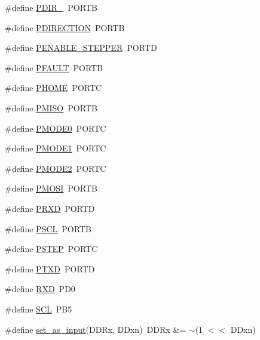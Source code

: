 \begin{DoxyCompactItemize}
\item 
\#define \hyperlink{group__biba__config_ga68d026b2f91c535d306bc10e7576056f}{P\-D\-I\-R\-\_}~P\-O\-R\-T\-B
\item 
\#define \hyperlink{group__biba__config_ga27c908eae571c75c5a5e37d6fcc8db9d}{P\-D\-I\-R\-E\-C\-T\-I\-O\-N}~P\-O\-R\-T\-B
\item 
\#define \hyperlink{group__biba__config_gaf49566bede8af55a9c7c7cb49722ca8a}{P\-E\-N\-A\-B\-L\-E\-\_\-\-S\-T\-E\-P\-P\-E\-R}~P\-O\-R\-T\-D
\item 
\#define \hyperlink{group__biba__config_gae646a630dc8c353cefb0a13c0fbe4a09}{P\-F\-A\-U\-L\-T}~P\-O\-R\-T\-B
\item 
\#define \hyperlink{group__biba__config_ga431ab20bf2b9e58830a8ecd2a294e8bc}{P\-H\-O\-M\-E}~P\-O\-R\-T\-C
\item 
\#define \hyperlink{group__biba__config_gaaf98ae1f6b0c231d734e204906a0e992}{P\-M\-I\-S\-O}~P\-O\-R\-T\-B
\item 
\#define \hyperlink{group__biba__config_gac31c37de4ad57d7e8e88d6a4ceb1a526}{P\-M\-O\-D\-E0}~P\-O\-R\-T\-C
\item 
\#define \hyperlink{group__biba__config_gae2b3b81d452af91ecd26298a6a9954a8}{P\-M\-O\-D\-E1}~P\-O\-R\-T\-C
\item 
\#define \hyperlink{group__biba__config_ga4e6fd56609bbd34dc3797ee35d8610e8}{P\-M\-O\-D\-E2}~P\-O\-R\-T\-C
\item 
\#define \hyperlink{group__biba__config_ga0bffda68fcafad7e4ec33f7acc04edb0}{P\-M\-O\-S\-I}~P\-O\-R\-T\-B
\item 
\#define \hyperlink{group__biba__config_gae632439c6ad45e36bc003a03e22e9e7a}{P\-R\-X\-D}~P\-O\-R\-T\-D
\item 
\#define \hyperlink{group__biba__config_ga40b96047acab9312add35336b138f140}{P\-S\-C\-L}~P\-O\-R\-T\-B
\item 
\#define \hyperlink{group__biba__config_gaa3a1d04d71d6791ec7d5d9bd6d2d8cb1}{P\-S\-T\-E\-P}~P\-O\-R\-T\-C
\item 
\#define \hyperlink{group__biba__config_ga56847c27276a6b03d9b40ca2141760d4}{P\-T\-X\-D}~P\-O\-R\-T\-D
\item 
\#define \hyperlink{group__biba__config_ga95855eaf9cee62de5402f124b1b8a27b}{R\-X\-D}~P\-D0
\item 
\#define \hyperlink{group__biba__config_gab5ffc4751921608954bb7a5687566b2d}{S\-C\-L}~P\-B5
\item 
\#define \hyperlink{group__biba__config_gaf5147cefc7b56baad8c6337a315ce07f}{set\-\_\-as\-\_\-input}(D\-D\-Rx, D\-Dxn)~D\-D\-Rx \&= $\sim$(1 $<$$<$ D\-Dxn)
$$
\end{DoxyCompactItemize}
